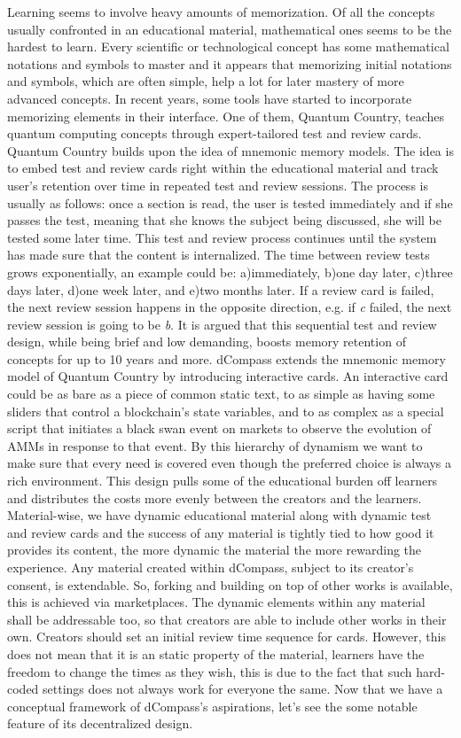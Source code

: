 \documentclass[12pt, a4paper]{article}
\begin{document}
Learning seems to involve heavy amounts of memorization. Of all the concepts usually confronted in  an educational material, mathematical ones seems to be the hardest to learn. Every scientific or technological concept has some mathematical notations and symbols to master and it appears that memorizing initial notations and symbols, which are often simple, help a lot for later mastery of more advanced concepts\cite{nielsen}. In recent years, some tools have started to incorporate memorizing elements in their interface. One of them, Quantum Country, teaches quantum computing concepts through expert-tailored test and review cards. Quantum Country builds upon the idea of mnemonic memory models\cite{matuschak}. The idea is to embed test and review cards right within the educational material and track user's retention over time in repeated test and review sessions. The process is usually as follows: once a section is read, the user is tested immediately and if she passes the test, meaning that she knows the subject being discussed, she will be tested some later time. This test and review process continues until the system has made sure that the content is internalized. The time between review tests grows exponentially, an example could be: a)immediately, b)one day later, c)three days later, d)one week later, and e)two months later. If a review card is failed, the next review session happens in the opposite direction, e.g. if \emph{c} failed, the next review session is going to be \emph{b}. It is argued that this sequential test and review design, while being brief and low demanding, boosts memory retention of concepts for up to 10 years and more\cite{nielsen}\cite{matuschak}.
dCompass extends the mnemonic memory model of Quantum Country by introducing interactive cards.  An interactive card could be as bare as a piece of common static text, to as simple as having some sliders that control a blockchain's state variables, and to as complex as a special script that initiates a black swan event on markets to observe the evolution of AMMs in response to that event. By this hierarchy of dynamism we want to make sure that every need is covered even though the preferred choice is always a rich environment. This design pulls some of the educational burden off learners and distributes the costs more evenly between the creators and the learners. Material-wise, we have dynamic educational material along with dynamic test and review cards and the success of any material is tightly tied to how good it provides its content, the more dynamic the material the more rewarding the experience. Any material created within dCompass, subject to its creator’s consent, is extendable. So, forking and building on top of other works is available, this is achieved via marketplaces. The dynamic elements within any material shall be addressable too, so that creators are able to include other works in their own. Creators should set an initial review time sequence for cards. However, this does not mean that it is an static property of the material, learners have the freedom to change the times as they wish, this is due to the fact that such hard-coded settings does not always work for everyone the same. Now that we have a conceptual framework of dCompass's aspirations, let’s see the some notable feature of its decentralized design.
\end{document}

